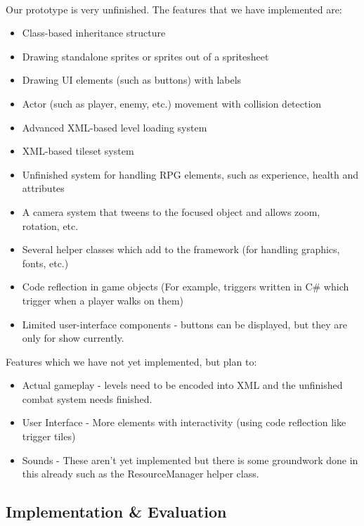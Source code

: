 \documentclass{article}
\begin{document}
\paragraph{}
Our prototype is very unfinished. The features that we have implemented are:
\begin{itemize}
\item Class-based inheritance structure
\item Drawing standalone sprites or sprites out of a spritesheet
\item Drawing UI elements (such as buttons) with labels
\item Actor (such as player, enemy, etc.) movement with collision detection
\item Advanced XML-based level loading system
\item XML-based tileset system
\item Unfinished system for handling RPG elements, such as experience, health and attributes
\item A camera system that tweens to the focused object and allows zoom, rotation, etc.
\item Several helper classes which add to the framework (for handling graphics, fonts, etc.)
\item Code reflection in game objects (For example, triggers written in C\# which trigger when a player walks on them)
\item Limited user-interface components - buttons can be displayed, but they are only for show currently.
\end{itemize}

Features which we have not yet implemented, but plan to:
\begin{itemize}
\item Actual gameplay - levels need to be encoded into XML and the unfinished combat system needs finished.
\item User Interface - More elements with interactivity (using code reflection like trigger tiles)
\item Sounds - These aren't yet implemented but there is some groundwork done in this already such as the ResourceManager helper class.
\end{itemize}
\subsection {Implementation \& Evaluation}
\end{document}
